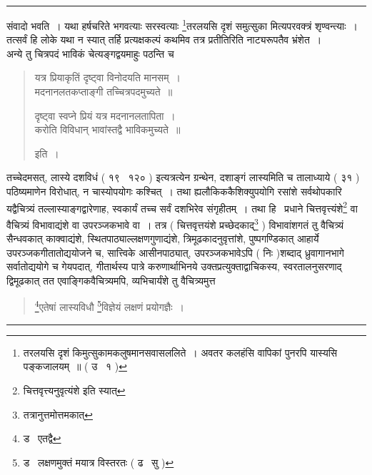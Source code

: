 \documentclass[11pt, openany]{book}
\begin{document}
\hrule

\vspace{2mm}
\noindent
संवादो भवति~। यथा हर्षचरिते भगवत्याः सरस्वत्याः \renewcommand{\thefootnote}{*}\footnote{तरलयसि दृशं किमुत्सुकामकलुषमानसवासललिते~। अवतर कलहंसि वापिकां पुनरपि यास्यसि पङ्कजालयम्~॥ ( उ \textendash\ १ )}{\qt तरलयसि दृशं समुत्सुका} मित्यपरवक्त्रं शृण्वन्त्याः~। तत्सर्वं हि लोके यथा न स्यात् तर्हि प्रत्यक्षकल्पं कथमिव तत्र प्रतीतिरिति नाट्यरूपतैव भ्रंशेत~।\\

अन्ये तु चित्रपदं भाविकं चेत्यङ्गद्वयमाहुः पठन्ति च\textendash

\begin{quote}
{\qt यत्र प्रियाकृतिं दृष्ट्वा विनोदयति मानसम्~।\\
मदनानलतकप्ताङ्गी तच्चित्रपदमुच्यते~॥

दृष्ट्वा स्वप्ने प्रियं यत्र मदनानलतापिता~।\\
करोति विविधान् भावांस्तद्वै भाविकमुच्यते~॥} इति~।
\end{quote}

\noindent
तच्चेदमसत्, {\qt लास्ये दशविधं} ( १९ \textendash\ १२० ) इत्यत्रत्येन ग्रन्थेन, {\qt दशाङ्गं लास्य}मिति च तालाध्याये ( ३१ ) पठिष्यमाणेन विरोधात्, न चास्योपयोगः कश्चित्~। तथा ह्यलौकिककैशिक्युपयोगि रसांशे सर्वथोपकारि यद्वैचित्र्यं तल्लास्याङ्गद्वारेणाह, स्वकार्यं तच्च सर्वं दशभिरेव संगृहीतम्~। तथा हि \textendash\ प्रधाने चित्तवृत्त्यंशे\renewcommand{\thefootnote}{$\dagger$}\footnote{{\qt चित्तवृत्त्यनुवृत्यंशे} इति स्यात्} वा वैचित्र्यं विभावाद्यंशे वा उपरञ्जकभावे वा~। तत्र ( चित्तवृत्तयंशे प्रच्छेदकाद्\renewcommand{\thefootnote}{$\ddagger$}\footnote{तत्रानुत्तमोत्तमकात्} ) विभावांशगतं तु वैचित्र्यं सैन्धवकात् काक्वाद्यंशे, स्थितपाठ्याल्लक्षणगुणाद्यंशे, त्रिमूढकादनुवृत्तांशे, पुष्पगण्डिकात् आहार्ये उपरञ्जकगीतातोद्ययोजने च, सात्त्विके आसीनपाठ्यात्, उपरञ्जकभावेऽपि ( निः )शब्दाद् ध्रुवागानभागे सर्वातोद्ययोगे च गेयपदात्, गीतार्थस्य पात्रे करुणार्थाभिनये उक्तप्रत्युक्ताद्वाचिकस्य, स्वरतालनुसरणाद् द्विमूढकात् तत एवाङ्गिकवैचित्र्यमपि, व्यभिचार्यंशे तु वैचित्र्यमुत्त \textendash

\newpage

\begin{quote}
{\na \renewcommand{\thefootnote}{1}\footnote{ड \textendash\ एतद्वै}एतेषां लास्यविधौ \renewcommand{\thefootnote}{2}\footnote{ड \textendash\ लक्षणमुक्तं मयात्र विस्तरतः ( ढ \textendash\ सु )}विज्ञेयं लक्षणं प्रयोगज्ञैः~।}
\end{quote}

\hrule
\end{document}
